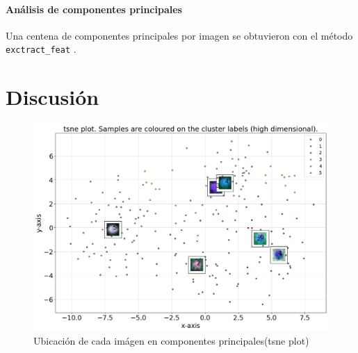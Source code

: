 \documentclass{article}
\begin{document}


\paragraph{Análisis de componentes principales}
Una centena de componentes principales por imagen se obtuvieron con el método \verb'exctract_feat' \cite{taskesen_pca_2020}.




\section{Discusión}

\begin{figure}
  \centering
  \includegraphics[width= 0.8\linewidth]{tsne}
  \caption{Ubicación de cada imágen en componentes principales(tsne plot)}
\end{figure}


\printbibliography[title= Referencias, heading=bibintoc]
\end{document}
